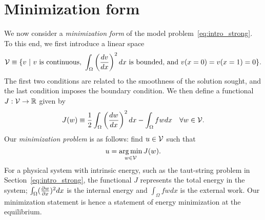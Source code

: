 \section{Minimization form}
We now consider a \emph{minimization form} of the model problem~\eqref{eq:intro_strong}.  To this end, we first introduce a linear space
\begin{equation}
  \calV \equiv \{ v \ | \
   v \text{ is continuous, } 
   \int_\Omega \left(\dd{v}{x}\right)^2 dx \text{ is bounded, and } %
   v(x=0) = v(x=1) = 0 \}.
  \label{eq:intro_V}
\end{equation}
The first two conditions are related to the smoothness of the solution sought, and the last condition imposes the boundary condition.
We then define a functional $J: \mathcal{V} \to \mathbb{R}$ given by
\begin{equation}
  J(w) \equiv \frac{1}{2} \int_\Omega \left( \frac{d w}{d x} \right)^2 dx - \int_\Omega f w dx \quad \forall w \in \mathcal{V}.
  \label{eq:intro_J}
\end{equation}
Our \emph{minimization problem} is as follows: find $u \in \mathcal{V}$ such that
\begin{equation}
  u = \operatorname*{arg\,min}_{w \in \mathcal{V}} J(w).
  \label{eq:intro_min}
\end{equation}
For a physical system with intrinsic energy, such as the taut-string problem in Section~\ref{eq:intro_strong}, the functional $J$ represents the total energy in the system; $\int_\Omega (\frac{\partial w}{\partial x})^2 dx$ is the internal energy and $\int_\Omega f w dx$ is the external work.  Our minimization statement is hence a statement of energy minimization at the equilibrium. 

